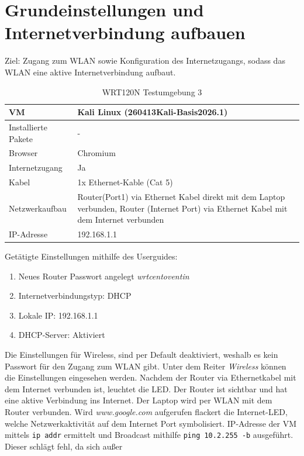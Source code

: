 	\section{Grundeinstellungen und Internetverbindung aufbauen}
	\label{w_basic_settings}
	Ziel: Zugang zum WLAN sowie Konfiguration des Internetzugangs, sodass das 
	WLAN eine aktive Internetverbindung aufbaut.
	\begin{table}[H]
		\hypertarget{tab_w_03}{}
		\begin{tabularx}{\columnwidth}{|l|X|}
			\hline
			VM & Kali Linux (260413Kali-Basis2026.1)\\
			\hline
			Installierte Pakete & - \\
			\hline
			Browser & Chromium \\
			\hline
			Internetzugang & Ja \\
			\hline
			Kabel & 1x Ethernet-Kable (Cat 5) \\
			\hline
			Netzwerkaufbau & Router(Port1) via Ethernet Kabel direkt mit dem Laptop
			verbunden, Router (Internet Port) via Ethernet Kabel mit dem Internet 
			verbunden\\
			\hline
			IP-Adresse & 192.168.1.1 \\
			\hline
		\end{tabularx}		
		\caption{WRT120N Testumgebung 3}
		\label{tab:tab_03}
	\end{table}
	Getätigte Einstellungen mithilfe des Userguides:
	\begin{enumerate}
		\item Neues Router Passwort angelegt \emph{wrtcentoventin}
		\item Internetverbindungstyp: DHCP
		\item Lokale IP: 192.168.1.1
		\item DHCP-Server: Aktiviert
	\end{enumerate}
	Die Einstellungen für Wireless, sind per Default deaktiviert, weshalb es kein
	Passwort für den Zugang zum WLAN gibt. Unter dem Reiter \emph{Wireless} können die
	Einstellungen eingesehen werden. Nachdem der Router via Ethernetkabel mit
	dem Internet verbunden ist, leuchtet die LED. Der Router ist sichtbar und hat
	eine aktive Verbindung ins Internet. Der Laptop wird per WLAN mit dem Router 
	verbunden. Wird \emph{www.google.com} aufgerufen flackert die Internet-LED, 
	welche Netzwerkaktivität auf dem Internet Port symbolisiert. 
	IP-Adresse der VM mittels \texttt{ip addr} ermittelt und Broadcast mithilfe 
	\texttt{ping 10.2.255 -b} ausgeführt. Dieser schlägt fehl, da sich außer
